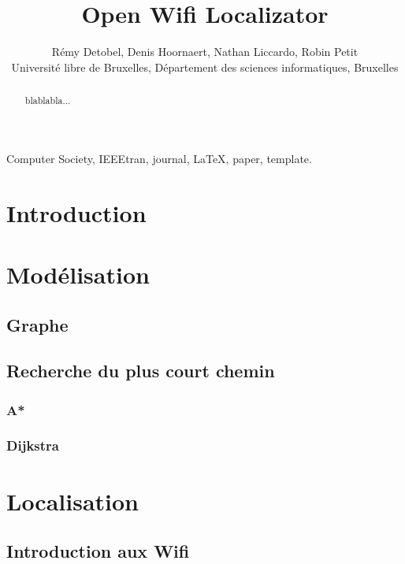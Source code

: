 \documentclass[11pt,journal,compsoc]{IEEEtran}
\begin{document}
\title{Open Wifi Localizator}
\author{Rémy Detobel, Denis Hoornaert, Nathan Liccardo, Robin Petit\\ Université libre de Bruxelles, Département des sciences informatiques, Bruxelles}

\maketitle


\begin{abstract}
  blablabla...
\end{abstract}
\begin{IEEEkeywords}
  Computer Society, IEEEtran, journal, \LaTeX, paper, template.
\end{IEEEkeywords}
\section{Introduction}
\section{Modélisation}
  \subsection{Graphe}
  \subsection{Recherche du plus court chemin}
    \subsubsection{A*}
    \subsubsection{Dijkstra}
\section{Localisation}
  \subsection{Introduction aux Wifi}
\end{document}
